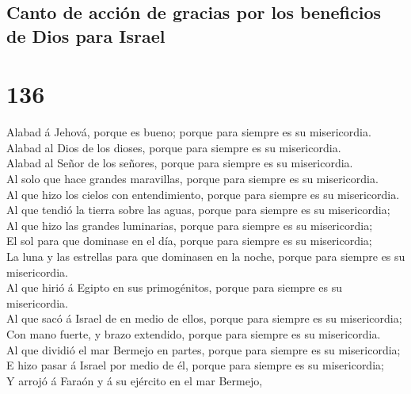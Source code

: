 \hypertarget{canto-de-acciuxf3n-de-gracias-por-los-beneficios-de-dios-para-israel}{%
\subsection{Canto de acción de gracias por los beneficios de Dios para
Israel}\label{canto-de-acciuxf3n-de-gracias-por-los-beneficios-de-dios-para-israel}}

\hypertarget{section-135}{%
\section{136}\label{section-135}}

 Alabad á Jehová, porque es bueno; porque para siempre es su
misericordia.\\
 Alabad al Dios de los dioses, porque para siempre es su
misericordia.\\
 Alabad al Señor de los señores, porque para siempre es su
misericordia.\\
 Al solo que hace grandes maravillas, porque para siempre es
su misericordia.\\
 Al que hizo los cielos con entendimiento, porque para
siempre es su misericordia.\\
 Al que tendió la tierra sobre las aguas, porque para
siempre es su misericordia;\\
 Al que hizo las grandes luminarias, porque para siempre es
su misericordia;\\
 El sol para que dominase en el día, porque para siempre es
su misericordia;\\
 La luna y las estrellas para que dominasen en la noche,
porque para siempre es su misericordia.\\
 Al que hirió á Egipto en sus primogénitos, porque para
siempre es su misericordia.\\
 Al que sacó á Israel de en medio de ellos, porque para
siempre es su misericordia;\\
 Con mano fuerte, y brazo extendido, porque para siempre es
su misericordia.\\
 Al que dividió el mar Bermejo en partes, porque para
siempre es su misericordia;\\
 E hizo pasar á Israel por medio de él, porque para siempre
es su misericordia;\\
 Y arrojó á Faraón y á su ejército en el mar Bermejo,
